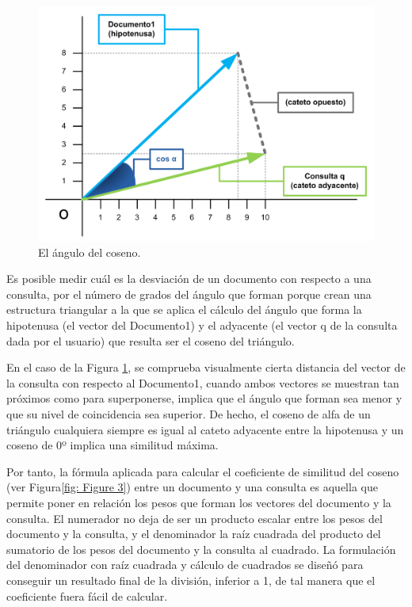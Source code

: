 \documentclass[titlepage]{article}
\begin{document}
\begin{figure}[h]
	\begin{center}
		\includegraphics*[scale=0.9]{similitud_coseno.png}
	\end{center}
	\caption{El ángulo del coseno.}
	\label{fig: Figure 2}
\end{figure}

Es posible medir cuál es la desviación de un documento con respecto a una consulta, por el número de grados del ángulo que forman porque crean una estructura triangular a la que se aplica el cálculo del ángulo que forma la hipotenusa (el vector del Documento1) y el adyacente (el vector q de la consulta dada por el usuario) que resulta ser el coseno del triángulo. 

En el caso de la Figura \ref{fig: Figure 2}, se comprueba visualmente cierta distancia del vector de la consulta con respecto al Documento1, cuando ambos vectores se muestran tan próximos como para superponerse, implica que el ángulo que forman sea menor y que su nivel de coincidencia sea superior. De hecho, el coseno de alfa de un triángulo cualquiera siempre es igual al cateto adyacente entre la hipotenusa y un coseno de 0º implica una similitud máxima.

Por tanto, la fórmula aplicada para calcular el coeficiente de similitud del coseno (ver Figura\ref{fig: Figure 3}) entre un documento y una consulta es aquella que permite poner en relación los pesos que forman los vectores del documento y la consulta. El numerador no deja de ser un producto escalar entre los pesos del documento y la consulta, y el denominador la raíz cuadrada del producto del sumatorio de los pesos del documento y la consulta al cuadrado. La formulación del denominador con raíz cuadrada y cálculo de cuadrados se diseñó para conseguir un resultado final de la división, inferior a 1, de tal manera que el coeficiente fuera fácil de calcular.
\end{document}
